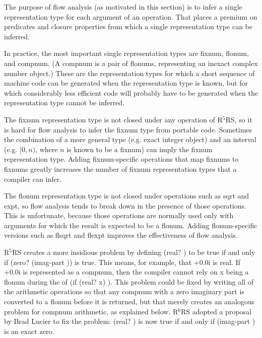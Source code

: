 \documentclass[twoside,twocolumn]{algol60}
\newcommand{\rn}[1]{R$^{#1}$RS}
\begin{document}
The purpose of flow analysis (as motivated in this section) is to infer a
single representation type for each argument of an operation.  That
places a premium on predicates and closure properties from which a
single representation type can be inferred.

In practice, the most important single representation types are
fixnum, flonum, and compnum.  (A compnum is a pair of flonums,
representing an inexact complex number object.)  These are the representation
types for which a short sequence of machine code can be generated when
the representation type is known, but for which considerably less
efficient code will probably have to be generated when the
representation type cannot be inferred.

The fixnum representation type is not closed under any operation of
\rn{5}, so it is hard for flow analysis to infer the fixnum type from
portable code.  Sometimes the combination of a more general type (e.g.
exact integer object) and an interval (e.g.  $[0,n)$, where $n$ is known to
be a fixnum) can imply the fixnum representation type.  Adding
fixnum-specific operations that map fixnums to fixnums 
greatly increases the number of fixnum
representation types that a compiler can infer.

The flonum representation type is not closed under operations such as
{\cf sqrt} and {\cf expt}, so flow analysis tends to break down in the
presence of those operations.  This is unfortunate, because those
operations are normally used only with arguments for which the result
is expected to be a flonum.  Adding flonum-specific versions such as
{\cf flsqrt} and {\cf flexpt} improves the effectiveness of flow
analysis.

\rn{5} creates a more insidious problem by defining {\cf (real?
  )} to be true if and only if {\cf (zero? (imag-part
  ))} is true.  This means, for example, that {+0.0i}
is real.  If {+0.0i} is represented as a compnum, then the
compiler cannot rely on x being a flonum during the 
of {\cf (if (real? x)  )}.  This
problem could be fixed by writing all of the arithmetic operations so
that any compnum with a zero imaginary part is converted to a flonum
before it is returned, but that merely creates an analogous problem
for compnum arithmetic, as explained below.  \rn{6} adopted a proposal
by Brad Lucier to fix the problem: {\cf (real? )} is now true
if and only if {\cf (imag-part )} is an exact zero.
\end{document}
